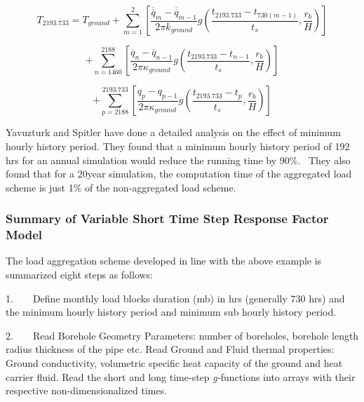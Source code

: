 \begin{equation}
{T_{2193.733}} = {T_{ground}} + \sum\limits_{m = 1}^2 {\left[ {\frac{{{{\overline{\overline q} }_m} - {{\overline{\overline q} }_{m - 1}}}}{{2\pi {k_{ground}}}}g\left( {\frac{{{t_{2193.733}} - {t_{730(m - 1)}}}}{{{t_s}}},\frac{{{r_b}}}{H}} \right)} \right]}
\end{equation}

\begin{equation}
+ \sum\limits_{n = 1460}^{2188} {\left[ {\frac{{{{\overline q }_n} - {{\overline q }_{n - 1}}}}{{2\pi {\kappa_{ground}}}}g\left( {\frac{{{t_{2193.733}} - {t_{n - 1}}}}{{{t_s}}},\frac{{{r_b}}}{H}} \right)} \right]}
\end{equation}

\begin{equation}
+ \sum\limits_{p = 2188}^{2193.733} {\left[ {\frac{{{q_p} - {q_{p - 1}}}}{{2\pi {\kappa_{ground}}}}g\left( {\frac{{{t_{2193.733}} - {t_p}}}{{{t_s}}},\frac{{{r_b}}}{H}} \right)} \right]}
\end{equation}

Yavuzturk and Spitler have done a detailed analysis on the effect of minimum hourly history period. They found that a minimum hourly history period of 192 hrs for an annual simulation would reduce the running time by 90\%.~ They also found that for a 20year simulation, the computation time of the aggregated load scheme is just 1\% of the non-aggregated load scheme.

\subsubsection{Summary of Variable Short Time Step Response Factor Model}\label{summary-of-variable-short-time-step-response-factor-model}

The load aggregation scheme developed in line with the above example is summarized eight steps as follows:

1.~~~~Define monthly load blocks duration (mb) in hrs (generally 730 hrs) and the minimum hourly history period and minimum sub hourly history period.

2.~~~~Read Borehole Geometry Parameters: number of boreholes, borehole length radius thickness of the pipe etc. Read Ground and Fluid thermal properties: Ground conductivity, volumetric specific heat capacity of the ground and heat carrier fluid. Read the short and long time-step \emph{g-}functions into arrays with their respective non-dimensionalized times.

